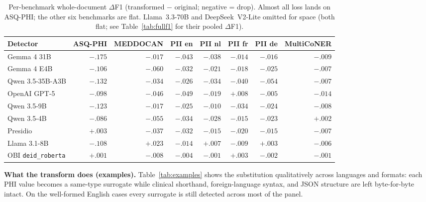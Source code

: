 \documentclass[11pt]{article}
\newcommand{\tp}[1]{\texttt{#1}}
\begin{document}
\begin{table}[t]\centering\small
\begin{tabular}{lrrrrrrr}
\toprule
Detector & ASQ-PHI & MEDDOCAN & PII en & PII nl & PII fr & PII de & MultiCoNER\\
\midrule
Gemma 4 31B & $-.175$ & $-.017$ & $-.043$ & $-.038$ & $-.014$ & $-.016$ & $-.009$\\
Gemma 4 E4B & $-.106$ & $-.060$ & $-.032$ & $-.021$ & $-.018$ & $-.025$ & $-.007$\\
Qwen 3.5-35B-A3B & $-.132$ & $-.034$ & $-.026$ & $-.034$ & $-.040$ & $-.054$ & $-.007$\\
OpenAI GPT-5 & $-.098$ & $-.046$ & $-.049$ & $-.019$ & $+.008$ & $-.005$ & $-.014$\\
Qwen 3.5-9B & $-.123$ & $-.017$ & $-.025$ & $-.010$ & $-.034$ & $-.024$ & $-.008$\\
Qwen 3.5-4B & $-.086$ & $-.055$ & $-.034$ & $-.028$ & $-.015$ & $-.023$ & $+.002$\\
Presidio & $+.003$ & $-.037$ & $-.032$ & $-.015$ & $-.020$ & $-.015$ & $-.007$\\
Llama 3.1-8B & $-.108$ & $+.023$ & $-.014$ & $+.007$ & $-.009$ & $+.003$ & $-.006$\\
OBI \tp{deid\_roberta} & $+.001$ & $-.008$ & $-.004$ & $-.001$ & $+.003$ & $-.002$ & $-.001$\\
\bottomrule
\end{tabular}
\caption{Per-benchmark whole-document $\Delta$F1 (transformed $-$ original; negative = drop). Almost all loss lands on ASQ-PHI; the other six benchmarks are flat. Llama~3.3-70B and DeepSeek~V2-Lite omitted for space (both flat; see Table~\ref{tab:fullf1} for their pooled $\Delta$F1).}\label{tab:perbench}
\end{table}

\textbf{What the transform does (examples).} Table~\ref{tab:examples} shows the substitution qualitatively across languages and formats: each PHI value becomes a same-type surrogate while clinical shorthand, foreign-language syntax, and JSON structure are left byte-for-byte intact. On the well-formed English cases every surrogate is still detected across most of the panel.
\end{document}
